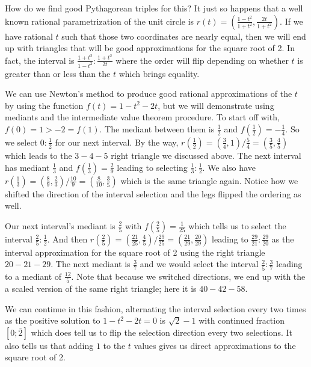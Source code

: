 \documentclass[12pt]{article}
\theoremstyle{remark}
\begin{document}
How do we find good Pythagorean triples for this? It just so happens that a well known rational parametrization of the unit circle is  $r(t) = (\frac{1-t^2}{1+t^2}, \frac{2t}{1+t^2})$.  If we have rational $t$ such that those two coordinates are nearly equal, then we will end up with triangles that will be good approximations for the square root of 2. In fact, the interval is $\frac{1+t^2}{1-t^2}:\frac{1+t^2}{2t}$ where the order will flip depending on whether $t$ is greater than or less than the $t$ which brings equality. 

We can use Newton's method to produce good rational approximations of the $t$ by using the function $f(t) = 1-t^2 - 2t$, but we will demonstrate using mediants and the intermediate value theorem procedure. To start off with, $f(0) = 1 > -2 = f(1)$. The mediant between them is $\frac{1}{2}$ and $f(\frac{1}{2}) = -\frac{1}{4}$. So we select $0:\frac{1}{2}$ for our next interval. By the way, $r(\frac{1}{2}) = (\frac{3}{4}, 1) / \frac{5}{4} = (\frac{3}{5}, \frac{4}{5})$ which leads to the $3-4-5$ right triangle we discussed above.  The next interval has mediant $\frac{1}{3}$ and $f(\frac{1}{3}) = \frac{2}{9}$ leading to selecting $\frac{1}{3}:\frac{1}{2}$. We also have $r(\frac{1}{3}) = ( \frac{8}{9}, \frac{2}{3}) / \frac{10}{9} = (\frac{8}{10}, \frac{3}{5})$ which is the same triangle again. Notice how we shifted the direction of the interval selection and the legs flipped the ordering as well.

Our next interval's mediant is $\frac{2}{5}$ with $f(\frac{2}{5}) = \frac{1}{25}$ which tells us to select the interval $\frac{2}{5}:\frac{1}{2}$. And then $r(\frac{2}{5}) = (\frac{21}{25}, \frac{4}{5})/\frac{29}{25} = (\frac{21}{29}, \frac{20}{29})$ leading to $\frac{29}{21}:\frac{29}{20}$ as the interval approximation for the square root of 2 using the right triangle $20-21-29$. The next mediant is $\frac{3}{7}$ and we would select the interval $\frac{2}{5}:\frac{3}{7}$ leading to a mediant of $\frac{12}{5}$.  Note that because we switched directions, we end up with the a scaled version of the same right triangle; here it is $40-42-58$. 

We can continue in this fashion, alternating the interval selection every two times as the positive solution to $1 - t^2 - 2t = 0$ is $\sqrt{2}-1$ with continued fraction $[0;\bar{2}]$ which does tell us to flip the selection direction every two selections. It also tells us that adding $1$ to the $t$ values gives us direct approximations to the square root of 2. 
\end{document}
